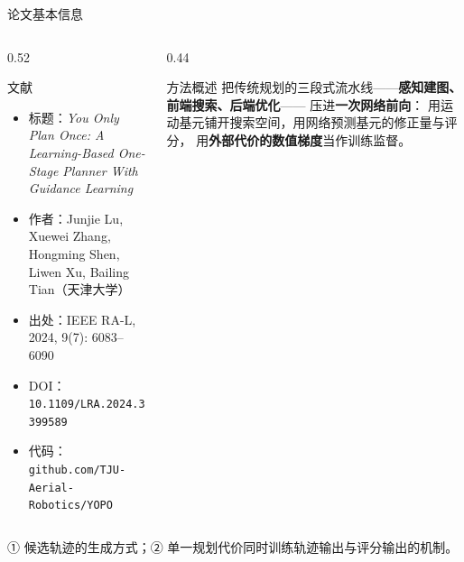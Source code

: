 \begin{frame}{论文基本信息}
  \small
  \begin{columns}[t]
    \begin{column}{0.52\textwidth}
      \begin{block}{文献}
        \begin{itemize}\tight
          \item 标题：\emph{You Only Plan Once: A Learning-Based One-Stage Planner With Guidance Learning}
          \item 作者：Junjie Lu, Xuewei Zhang, Hongming Shen, Liwen Xu, Bailing Tian（天津大学）
          \item 出处：IEEE RA-L, 2024, 9(7): 6083--6090
          \item DOI：\texttt{10.1109/LRA.2024.3399589}
          \item 代码：\texttt{github.com/TJU-Aerial-Robotics/YOPO}
        \end{itemize}
      \end{block}
    \end{column}
    \begin{column}{0.44\textwidth}
      \begin{block}{方法概述}
        \footnotesize
        把传统规划的三段式流水线——\textbf{感知建图、前端搜索、后端优化}——
        压进\textbf{一次网络前向}：
        用运动基元铺开搜索空间，用网络预测基元的修正量与评分，
        用\textbf{外部代价的数值梯度}当作训练监督。
      \end{block}
    \end{column}
  \end{columns}

  \vspace{0.2em}
  \begin{paperfinding}[本报告聚焦的两问]
    \footnotesize
    ① 候选轨迹的生成方式；② 单一规划代价同时训练轨迹输出与评分输出的机制。
  \end{paperfinding}
\end{frame}

